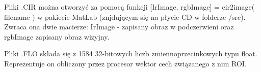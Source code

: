Pliki .CIR można otworzyć za pomocą funkcji [IrImage, rgbImage] = cir2image( filename ) w pakiecie MatLab (znjdującym się na płycie CD w folderze /src). Zwraca ona dwie macierze: IrImage - zapisany obraz w podczerwieni oraz rgbImage zapisany obraz wizyjny.

Pliki .FLO składa się z 1584 32-bitowych liczb zmiennoprzecinkowych typu float. Reprezentuje on obliczony przez procesor wektor cech związanego z nim ROI.
